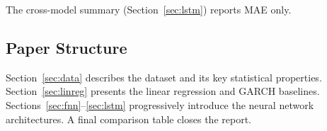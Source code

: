 The cross-model summary (Section~\ref{sec:lstm}) reports MAE only.

\subsection{Paper Structure}

Section~\ref{sec:data} describes the dataset and its key statistical properties.
Section~\ref{sec:linreg} presents the linear regression and GARCH baselines.
Sections~\ref{sec:fnn}--\ref{sec:lstm} progressively introduce the neural network
architectures. A final comparison table closes the report.
